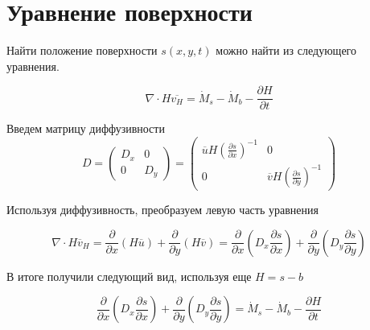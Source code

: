 \section*{Уравнение поверхности}

Найти положение поверхности $s(x, y, t)$ можно
найти из следующего уравнения.

\begin{equation*}
    \nabla
    \cdot
    H
    \overline{v_{H}}
    =
    \dot{M}_s
    -
    \dot{M}_b
    -
    \frac
        {\partial H}
        {\partial t}
\end{equation*}

Введем матрицу диффузивности
\begin{equation*}
    D
    =
    \begin{pmatrix}
        D_{x}
        &
        0
    \\
        0
        &
        D_{y}
    \end{pmatrix}
    =
    \begin{pmatrix}
        \overline{u}
        H
        \left(
            \frac
                {\partial s}
                {\partial x}
        \right)^{-1}
        &
        0
    \\
        0
        &
        \overline{v}
        H
        \left(
            \frac
                {\partial s}
                {\partial y}
        \right)^{-1}
    \end{pmatrix}
\end{equation*}

Используя диффузивность, преобразуем левую часть уравнения

\begin{equation*}
    \nabla
    \cdot
    H
    \overline{v}_H
    =
    \frac
        {\partial}
        {\partial x}
    \left(
        H
        \overline{u}
    \right)
    +
    \frac
        {\partial}
        {\partial y}
    \left(
        H
        \overline{v}
    \right)
    =
    \frac
        {\partial}
        {\partial x}
    \left(
        D_{x}
        \frac
            {\partial s}
            {\partial x}
    \right)
    +
    \frac
        {\partial}
        {\partial y}
    \left(
        D_{y}
        \frac
            {\partial s}
            {\partial y}
    \right)
\end{equation*}

В итоге получили следующий вид, используя еще $H=s-b$

\begin{equation*}
    \frac
        {\partial}
        {\partial x}
    \left(
        D_{x}
        \frac
            {\partial s}
            {\partial x}
    \right)
    +
    \frac
        {\partial}
        {\partial y}
    \left(
        D_{y}
        \frac
            {\partial s}
            {\partial y}
    \right)
    =
    \dot{M}_s
    -
    \dot{M}_b
    -
    \frac
        {\partial H}
        {\partial t}
\end{equation*}

